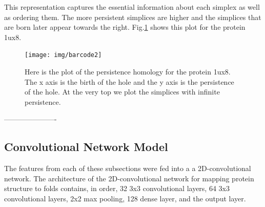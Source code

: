 \documentclass[12pt, a4paper, twocolumn, fullpage]{article}
\theoremstyle{plain}
\theoremstyle{definition}
\theoremstyle{remark}
\begin{document}
This representation captures the essential information about each simplex as well as ordering them. The more persistent simplices are higher and the simplices that are born later appear towards the right.  Fig.\ref{bcodeImg} shows this plot for the protein 1ux8.

\begin{figure}
    \texttt{[image: img/barcode2]}
    \caption{Here is the plot of the persistence homology for the protein 1ux8. The x axis is the birth of the hole and the y axis is the persistence of the hole. At the very top we plot the simplices with infinite persistence.}
    \label{bcodeImg}
\end{figure}
----------------------
\subsection{Convolutional Network Model}

The features from each of these subsections were fed into a a 2D-convolutional network. The architecture of the 2D-convolutional network for mapping protein structure to folds contains, in order, 32 3x3 convolutional layers, 64 3x3 convolutional layers, 2x2 max pooling, 128 dense layer, and the output layer.
\end{document}

